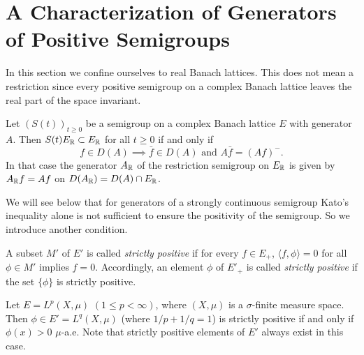 \section{A Characterization of Generators of Positive Semigroups}\label{sec:c2-3}%
%
%
In this section we confine ourselves to real Banach lattices.
This does not mean a restriction since every positive semigroup on a complex Banach lattice leaves the real part of the space invariant.
\begin{remark}\label{rem:c2-3.1}
%
%
%
Let $(S(t))_{t \geq 0}$ be a semigroup on a complex Banach lattice $E$ with generator $A$.
Then $S(t)E_{\mathbb{R}} \subset E_{\mathbb{R}}$ for all $t \geq 0$ if and only if
\begin{equation}\label{eq:c2-3.1}
f \in D(A) \implies \bar{f} \in D(A) \text{ and } A\bar{f} = (Af)^{-}  .
\end{equation}
In that case the generator $A_{\mathbb{R}}$ of the restriction semigroup on $E_{\mathbb{R}}$ is given by\\  $A_{\mathbb{R}}f = Af$ on $D(A_{\mathbb{R}}) = D(A) \cap E_{\mathbb{R}}$.
\end{remark}
We will see below that for generators of a strongly continuous semigroup Kato's inequality alone is not sufficient to ensure the positivity of the semigroup.
So we introduce another condition.
\begin{definition}\label{def:c2-3.2}
%
%
%
A subset $M'$ of $E'$ is called \emph{strictly positive} if for every $f \in E_{+}$, $\langle f,\phi \rangle = 0$ for all $\phi \in M'$ implies $f = 0$.
Accordingly, an element $\phi$ of $E'_{+}$ is called \emph{strictly positive} if the set $\{\phi\}$ is strictly positive.
\end{definition}
\begin{example}\label{ex:c2-3.3}
%
%
%
Let $E = L^p(X,\mu)$ $(1 \leq p < \infty)$, where $(X,\mu)$ is a $\sigma$-finite measure space.
Then $\phi \in E'
= L^q(X,\mu)$ (where $1/p + 1/q = 1$) is strictly positive if and only if $\phi(x) > 0$ $\mu$-a.e.
Note that strictly positive elements of $E'$ always exist in this case.
\end{example}

